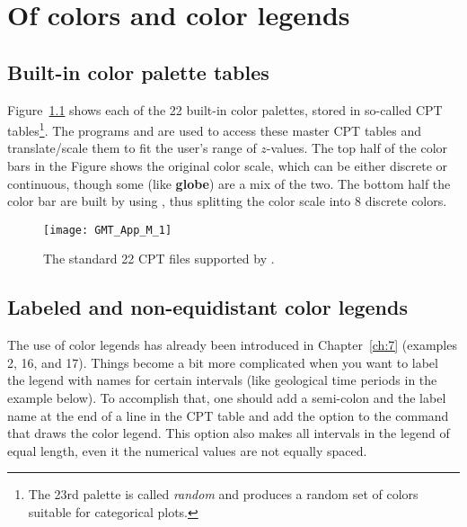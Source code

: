 %
%
\chapter{Of colors and color legends}
\label{app:M}
\section{Built-in color palette tables}
\thispagestyle{headings}

Figure~\ref{fig:GMT_App_M_1} shows each of the 22 built-in color palettes,
stored in so-called CPT tables\footnote{The 23rd palette is called \emph{random}
and produces a random set of colors suitable for categorical plots.}.
The programs  and  are used to access these master CPT tables
and translate/scale them to fit the user's range of $z$-values.
The top half of the color bars in the Figure shows the original color scale, which can be either discrete or
continuous, though some (like \textbf{globe}) are a mix of the two.
The bottom half the color bar are built by using
 , thus splitting the color scale into 8 discrete colors.

\begin{figure}[h]
\centering
\texttt{[image: GMT\_App\_M\_1]}
\caption{The standard 22 CPT files supported by \gmt.}
\label{fig:GMT_App_M_1}
\end{figure}

\section{Labeled and non-equidistant color legends}
\label{app:colorbars}
The use of color legends has already been introduced in Chapter~\ref{ch:7} (examples 2, 16, and 17). Things become a bit more complicated when you want to label the legend with names for certain intervals (like geological time periods in the example below). To accomplish that, one should add a semi-colon and the label name at the end of a line in the CPT table and add the  option to the  command that draws the color legend. This option also makes all intervals in the legend of equal length, even it the numerical values are not equally spaced.


